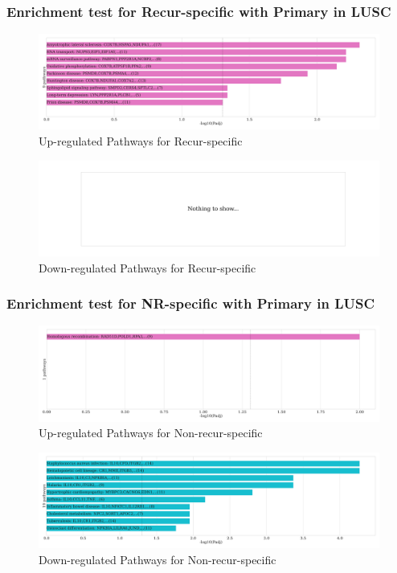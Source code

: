 \documentclass{beamer}
\begin{document}
    \begin{frame}
        \frametitle{Enrichment test for Recur-specific with Primary in LUSC}

        \begin{figure}
            \includegraphics[width=0.8 \linewidth]{figures/DEG/Enrichment/STAR.SQC-Primary.Recur.Up.KEGG.pdf}
            \caption{Up-regulated Pathways for Recur-specific}
        \end{figure}

        \begin{figure}
            \includegraphics[width=0.8 \linewidth]{figures/DEG/Enrichment/STAR.SQC-Primary.Recur.Down.KEGG.pdf}
            \caption{Down-regulated Pathways for Recur-specific}
        \end{figure}
    \end{frame}

    \begin{frame}
        \frametitle{Enrichment test for NR-specific with Primary in LUSC}

        \begin{figure}
            \includegraphics[width=0.8 \linewidth]{figures/DEG/Enrichment/STAR.SQC-Primary.Nonrecur.Up.KEGG.pdf}
            \caption{Up-regulated Pathways for Non-recur-specific}
        \end{figure}

        \begin{figure}
            \includegraphics[width=0.8 \linewidth]{figures/DEG/Enrichment/STAR.SQC-Primary.Nonrecur.Down.KEGG.pdf}
            \caption{Down-regulated Pathways for Non-recur-specific}
        \end{figure}
    \end{frame}
\end{document}
